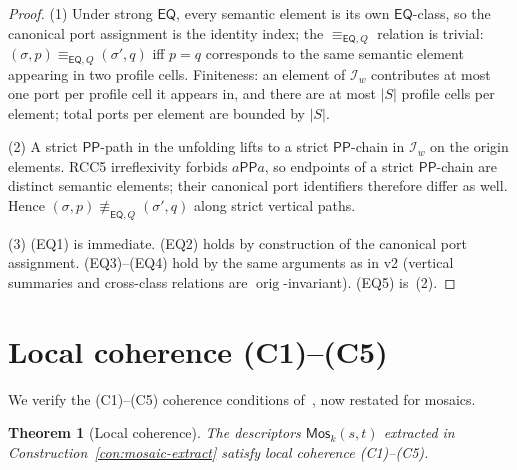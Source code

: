 \documentclass[11pt]{article}
\newtheorem{theorem}{Theorem}[section]
\theoremstyle{definition}
\theoremstyle{remark}
\newcommand{\PP}{\mathsf{PP}}
\newcommand{\EQ}{\mathsf{EQ}}
\newcommand{\orig}{\operatorname{orig}}
\newcommand{\Mos}{\mathsf{Mos}}
\newcommand{\eqQ}{\equiv_{\EQ,Q}}
\begin{document}
\begin{proof}
(1)\; Under strong $\EQ$, every semantic element is its own
$\EQ$-class, so the canonical port assignment is the identity index;
the $\eqQ$ relation is trivial: $(\sigma,p)\eqQ(\sigma',q)$ iff
$p=q$ corresponds to the same semantic element appearing in two
profile cells.  Finiteness: an element of $\mathcal{I}_w$ contributes
at most one port per profile cell it appears in, and there are at
most $|S|$ profile cells per element; total ports per element are
bounded by $|S|$.

(2)\; A strict $\PP$-path in the unfolding lifts to a strict
$\PP$-chain in $\mathcal{I}_w$ on the origin elements.  RCC5
irreflexivity forbids $a\PP a$, so endpoints of a strict
$\PP$-chain are distinct semantic elements; their canonical port
identifiers therefore differ as well.  Hence
$(\sigma,p)\not\eqQ(\sigma',q)$ along strict vertical paths.

(3)\; (EQ1) is immediate.  (EQ2) holds by construction of the
canonical port assignment.  (EQ3)--(EQ4) hold by the same arguments
as in v2 (vertical summaries and cross-class relations are
$\orig$-invariant).  (EQ5) is~(2).
\end{proof}


\section{Local coherence (C1)--(C5)}
\label{sec:coherence}

We verify the (C1)--(C5) coherence conditions
of~\cite[Definition~1.8]{SplitForest}, now restated for mosaics.

\begin{theorem}[Local coherence]\label{thm:coherence}
The descriptors $\Mos_k(s,t)$ extracted in
Construction~\ref{con:mosaic-extract} satisfy local coherence
(C1)--(C5).
\end{theorem}
\end{document}

